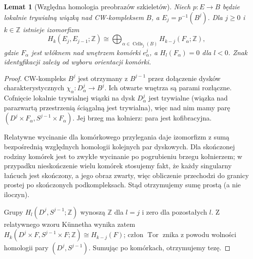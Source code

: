 \documentclass[11pt,a4paper,oneside]{report}
\newcommand{\Z}{\mathbb{Z}}
\theoremstyle{plain}
\newtheorem{lemat}[twierdzenie]{Lemat}
\theoremstyle{definition}
\theoremstyle{remark}
\begin{document}
\begin{lemat}[Względna homologia preobrazów szkieletów]
\label{lem:serre-cells-v5}
Niech $p:E\to B$ będzie lokalnie trywialną wiązką nad
CW-kompleksem $B$, a $E_j=p^{-1}(B^j)$.
Dla $j\ge0$ i $k\in\Z$ istnieje izomorfizm
\[
H_k(E_j,E_{j-1};\Z)\cong
\bigoplus_{\alpha\in\operatorname{Cells}_j(B)}H_{k-j}(F_\alpha;\Z),
\]
gdzie $F_\alpha$ jest włóknem nad wnętrzem komórki
$e^j_\alpha$, a $H_l(F_\alpha)=0$ dla $l<0$.
Znak identyfikacji zależy od wyboru orientacji komórki.
\end{lemat}
\begin{proof}
CW-kompleks $B^j$ jest otrzymany z $B^{j-1}$ przez
dołączenie dysków charakterystycznych
$\chi_\alpha:D^j_\alpha\to B^j$. Ich otwarte wnętrza
są parami rozłączne. Cofnięcie lokalnie trywialnej wiązki
na dysk $D^j_\alpha$ jest trywialne (wiązka nad
parazwartą przestrzenią ściągalną jest trywialna), więc
nad nim mamy parę
$(D^j\times F_\alpha,S^{j-1}\times F_\alpha)$.
Jej brzeg ma kołnierz: para jest kofibracyjna.

Relatywne wycinanie dla komórkowego przylegania daje
izomorfizm z sumą bezpośrednią względnych homologii
kolejnych par dyskowych. Dla skończonej rodziny komórek
jest to zwykłe wycinanie po pogrubieniu brzegu kołnierzem;
w przypadku nieskończenie wielu komórek stosujemy fakt,
że każdy singularny łańcuch jest skończony, a jego obraz
zwarty, więc obliczenie przechodzi do granicy prostej
po skończonych podkompleksach. Stąd otrzymujemy sumę
prostą (a nie iloczyn).

Grupy $H_l(D^j,S^{j-1};\Z)$ wynoszą $\Z$ dla $l=j$
i zero dla pozostałych $l$. Z relatywnego wzoru
Künnetha wynika zatem
$H_k(D^j\times F,S^{j-1}\times F;\Z)\cong H_{k-j}(F)$;
człon $\operatorname{Tor}$ znika z powodu wolności
homologii pary $(D^j,S^{j-1})$.
Sumując po komórkach, otrzymujemy tezę.
\end{proof}
\end{document}
